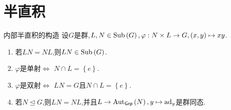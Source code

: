 \section{半直积}

\begin{proposition}{内部半直积的构造}{}
	设$G$是群,$L,N\in\operatorname{Sub}\left(G\right),\varphi:N\times L\to G,\left(x,y\right)\mapsto xy$.
	\begin{enumerate}
		\item 若$LN=NL$,则$LN\in\operatorname{Sub}\left(G\right)$.
		\item $\varphi$是单射$\iff$ $N\cap L=\left\{e\right\}$.
		\item $\varphi$是双射$\iff$ $LN=G$且$N\cap L=\left\{e\right\}$.
		\item 若$N\unlhd G$,则$LN=NL$,并且$L\to\operatorname{Aut}_{\mathsf{Grp}}\left(N\right),y\mapsto\operatorname{ad}_{y}$是群同态.
	\end{enumerate}
\end{proposition}

